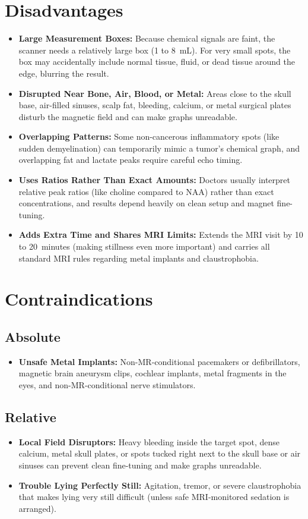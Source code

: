 \section{Disadvantages}
\begin{itemize}
\item \textbf{Large Measurement Boxes:} Because chemical signals are faint, the scanner needs a relatively large box (1 to 8~mL). For very small spots, the box may accidentally include normal tissue, fluid, or dead tissue around the edge, blurring the result.
\item \textbf{Disrupted Near Bone, Air, Blood, or Metal:} Areas close to the skull base, air-filled sinuses, scalp fat, bleeding, calcium, or metal surgical plates disturb the magnetic field and can make graphs unreadable.
\item \textbf{Overlapping Patterns:} Some non-cancerous inflammatory spots (like sudden demyelination) can temporarily mimic a tumor's chemical graph, and overlapping fat and lactate peaks require careful echo timing.
\item \textbf{Uses Ratios Rather Than Exact Amounts:} Doctors usually interpret relative peak ratios (like choline compared to NAA) rather than exact concentrations, and results depend heavily on clean setup and magnet fine-tuning.
\item \textbf{Adds Extra Time and Shares MRI Limits:} Extends the MRI visit by 10 to 20~minutes (making stillness even more important) and carries all standard MRI rules regarding metal implants and claustrophobia.
\end{itemize}

\section{Contraindications}

\subsection{Absolute}
\begin{itemize}
\item \textbf{Unsafe Metal Implants:} Non-MR-conditional pacemakers or defibrillators, magnetic brain aneurysm clips, cochlear implants, metal fragments in the eyes, and non-MR-conditional nerve stimulators.
\end{itemize}

\subsection{Relative}
\begin{itemize}
\item \textbf{Local Field Disruptors:} Heavy bleeding inside the target spot, dense calcium, metal skull plates, or spots tucked right next to the skull base or air sinuses can prevent clean fine-tuning and make graphs unreadable.
\item \textbf{Trouble Lying Perfectly Still:} Agitation, tremor, or severe claustrophobia that makes lying very still difficult (unless safe MRI-monitored sedation is arranged).
\end{itemize}

